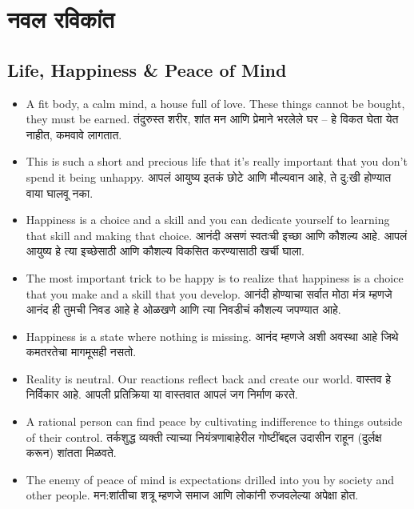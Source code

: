 \chapter{नवल रविकांत}

\section*{Life, Happiness \& Peace of Mind}
\begin{itemize}
  \item A fit body, a calm mind, a house full of love. These things cannot be bought, they must be earned. तंदुरुस्त शरीर, शांत मन आणि प्रेमाने भरलेले घर – हे विकत घेता येत नाहीत, कमवावे लागतात.

  \item This is such a short and precious life that it’s really important that you don’t spend it being unhappy. आपलं आयुष्य इतकं छोटे आणि मौल्यवान आहे, ते दु:खी होण्यात वाया घालवू नका.

  \item Happiness is a choice and a skill and you can dedicate yourself to learning that skill and making that choice. आनंदी असणं स्वतःची इच्छा आणि कौशल्य आहे. आपलं आयुष्य हे त्या इच्छेसाठी आणि कौशल्य विकसित करण्यासाठी खर्ची घाला.

  \item The most important trick to be happy is to realize that happiness is a choice that you make and a skill that you develop. आनंदी होण्याचा सर्वात मोठा मंत्र म्हणजे आनंद ही तुमची निवड आहे हे ओळखणे आणि त्या निवडीचं कौशल्य जपण्यात आहे. 

  \item Happiness is a state where nothing is missing. आनंद म्हणजे अशी अवस्था आहे जिथे कमतरतेचा मागमूसही नसतो. 

  \item Reality is neutral. Our reactions reflect back and create our world. वास्तव हे निर्विकार आहे. आपली प्रतिक्रिया या वास्तवात आपलं जग निर्माण करते. 

  \item A rational person can find peace by cultivating indifference to things outside of their control. तर्कशुद्ध व्यक्ती त्याच्या नियंत्रणाबाहेरील गोष्टींबद्दल उदासीन राहून (दुर्लक्ष करून) शांतता मिळवते. 

  \item The enemy of peace of mind is expectations drilled into you by society and other people. मन:शांतीचा शत्रू म्हणजे समाज आणि लोकांनी रुजवलेल्या अपेक्षा होत. 


\end{itemize}
